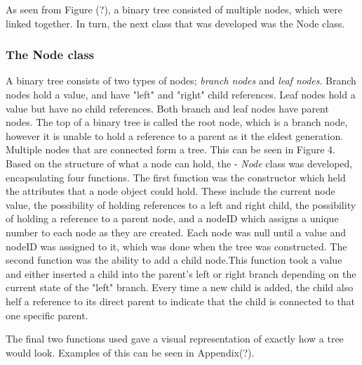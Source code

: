 \documentclass[11pt]{article}
\begin{document}
As seen from Figure (?), a binary tree consisted of multiple nodes, which were linked together. In turn, the next class that was developed was the Node class. 
\subsubsection{The Node class}\label{subsubsec:node}
 A binary tree consists of two types of nodes; \textit{branch nodes} and \textit{leaf nodes}. Branch nodes hold a value, and have "left" and "right" child references. Leaf nodes hold a value but have no child references. Both branch and leaf nodes have parent nodes. The top of a binary tree is called the root node, which is a branch node, however it is unable to hold a reference to a parent as it the eldest generation. Multiple nodes that are connected form a tree. This can be seen in Figure 4.  \\
Based on the structure of what a node can hold, the - \textit{Node} class was developed, encapsulating four functions. The first function was the constructor which held the attributes that a node object could hold. These include the current node value, the possibility of holding references to a left and right child, the possibility of holding a reference to a parent node, and a nodeID which assigns a unique number to each node as they are created.
Each node was null until a value and nodeID was assigned to it, which was done when the tree was constructed. The second function was the ability to add a child node.This function took a value and either inserted a child into the parent's left or right branch depending on the current state of the "left" branch. Every time a new child is added, the child also helf a reference to its direct parent to indicate that the child is connected to that one specific parent.
 
The final two functions used gave a visual representation of exactly how a tree would look. Examples of this can be seen in Appendix(?). 
\end{document}
